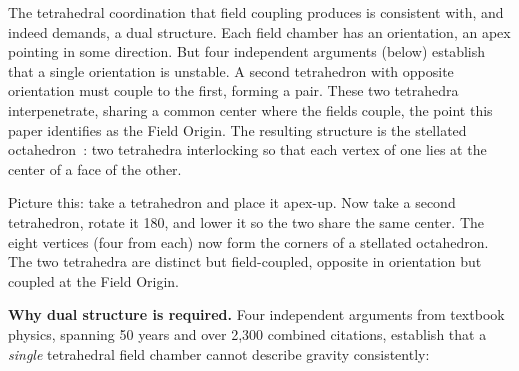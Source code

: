 \documentclass[aps,prd,preprint,superscriptaddress,showpacs,preprintnumbers,amsmath,amssymb,nofootinbib]{revtex4-2}
\begin{document}
The tetrahedral coordination that field coupling produces is consistent with, and indeed demands, a dual structure. Each field chamber has an orientation, an apex pointing in some direction. But four independent arguments (below) establish that a single orientation is unstable. A second tetrahedron with opposite orientation must couple to the first, forming a pair. These two tetrahedra interpenetrate, sharing a common center where the fields couple, the point this paper identifies as the Field Origin. The resulting structure is the stellated octahedron~\cite{coxeter1973}: two tetrahedra interlocking so that each vertex of one lies at the center of a face of the other.

Picture this: take a tetrahedron and place it apex-up. Now take a second tetrahedron, rotate it 180\textdegree, and lower it so the two share the same center. The eight vertices (four from each) now form the corners of a stellated octahedron. The two tetrahedra are distinct but field-coupled, opposite in orientation but coupled at the Field Origin.

\textbf{Why dual structure is required.} Four independent arguments from textbook physics, spanning 50 years and over 2,300 combined citations, establish that a \emph{single} tetrahedral field chamber cannot describe gravity consistently:
\end{document}
